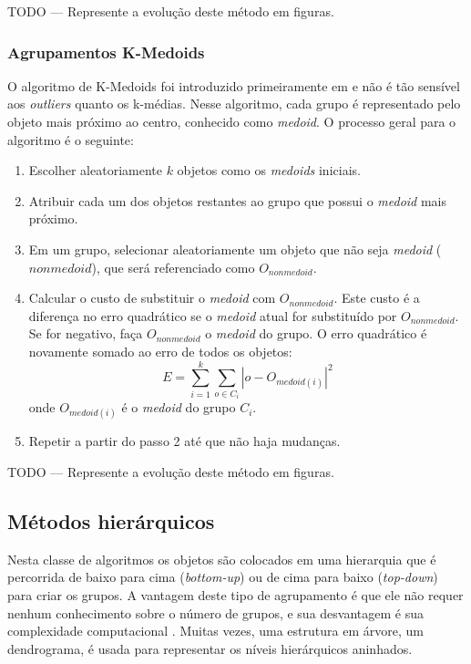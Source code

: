 TODO --- Represente a evolução deste método em figuras.
\subsubsection{Agrupamentos K-Medoids}
O algoritmo de K-Medoids foi introduzido primeiramente em \cite{kaufmann1990} e não é tão sensível aos \textit{outliers} quanto os k-médias. Nesse algoritmo, cada grupo é representado pelo objeto mais próximo ao centro, conhecido como \textit{medoid}.
O processo geral para o algoritmo é o seguinte:
 \begin{enumerate}
 	\item Escolher aleatoriamente ${k}$ objetos como os \textit{medoids} iniciais.
 	\item Atribuir cada um dos objetos restantes ao grupo que possui o \textit{medoid} mais próximo.
 	\item Em um grupo, selecionar aleatoriamente um objeto que não seja \textit{medoid} (${nonmedoid}$), que será referenciado como ${O_{nonmedoid}}$.
 	\item Calcular o custo de substituir o \textit{medoid} com ${O_{nonmedoid}}$. Este custo é a diferença no erro quadrático se o \textit{medoid} atual for substituído por ${O_{nonmedoid}}$. Se for negativo, faça ${O_{nonmedoid}}$ o \textit{medoid} do grupo. O erro quadrático é novamente somado ao erro de todos os objetos:
 	\begin{equation}
 	E = \sum_{i=1}^{k}\sum_{o\in C_{i}} |o - O_{medoid(i)}|^{2}
 	\end{equation}
 	onde ${O_{medoid(i)}}$ é o \textit{medoid} do grupo ${C_{i}}$.
 	\item Repetir a partir do passo 2 até que não haja mudanças. 
 \end{enumerate}
TODO --- Represente a evolução deste método em figuras.

\subsection{Métodos hierárquicos}
Nesta classe de algoritmos os objetos são colocados em uma hierarquia que é percorrida de baixo para cima (\textit{bottom-up}) ou de cima para baixo (\textit{top-down}) para criar os grupos. A vantagem deste tipo de agrupamento é que ele não requer nenhum conhecimento sobre o número de grupos, e sua desvantagem é sua complexidade computacional \cite{Lin2004}. Muitas vezes, uma estrutura em árvore, um dendrograma, é usada para representar os níveis hierárquicos aninhados.

